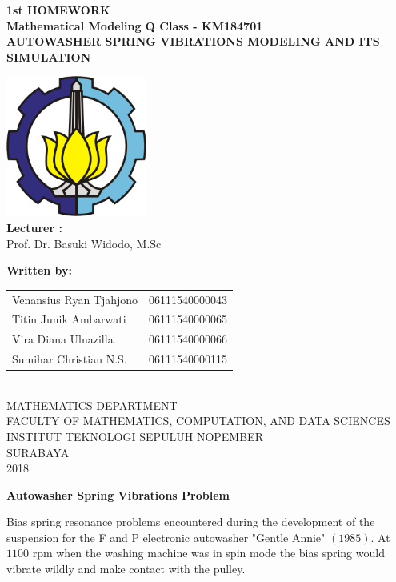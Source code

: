 \documentclass[12pt,a4paper]{article}
\begin{document}
	\begin{center}
		\thispagestyle{empty}
		\vspace{3cm}
		\textbf{1st HOMEWORK\\
			Mathematical Modeling Q Class - KM184701\\}
		\vspace{0.75cm}
		\textbf{\large AUTOWASHER SPRING VIBRATIONS MODELING AND ITS SIMULATION}
		\vspace{2cm}
			
		\includegraphics[width=175px]{picits.png}\\\vspace{3cm}
		\textbf{Lecturer :}\\Prof. Dr. Basuki Widodo, M.Sc\\
		\vspace{0.75cm}
		
		\textbf{Written by:}\\
		\begin{tabular}{ll}
			Venansius Ryan Tjahjono&06111540000043\\
			Titin Junik Ambarwati&06111540000065\\
			Vira Diana Ulnazilla&06111540000066\\
			Sumihar Christian N.S.&06111540000115
		\end{tabular}\\
		\vspace{2cm}	
		MATHEMATICS DEPARTMENT\\
		FACULTY OF MATHEMATICS, COMPUTATION, AND DATA SCIENCES\\
		INSTITUT TEKNOLOGI SEPULUH NOPEMBER\\
		SURABAYA\\
		2018
	\end{center}
	\pagebreak
	\begin{center}
		\Huge
		\textbf{Autowasher Spring Vibrations Problem}
	\end{center}
	Bias spring resonance problems encountered during the development of the suspension for the F and P electronic autowasher "Gentle Annie" $(1985)$. At $1100$ rpm when the washing machine was in spin mode the bias spring would vibrate wildly and make contact with the pulley.
\end{document}
